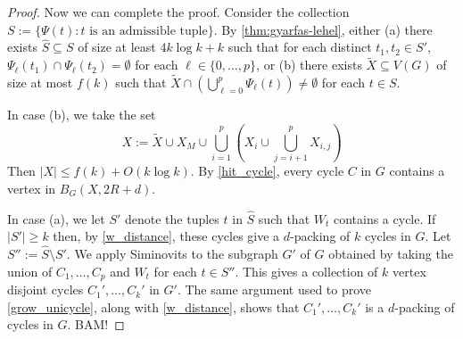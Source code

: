 \documentclass{patmorin}
\begin{document}
\begin{proof}
Now we can complete the proof. Consider the collection $S:=\{\Psi(t):\text{$t$ is an admissible tuple}\}$.  By \cref{thm:gyarfas-lehel}, either (a) there exists $\hat{S}\subseteq S$ of size at least $4k\log k+k$ such that for each distinct  $t_1,t_2\in S'$, $\Psi_\ell(t_1)\cap\Psi_\ell(t_2)=\emptyset$ for each $\ell\in\{0,\ldots,p\}$, or (b) there exists $\tilde{X}\subseteq V(G)$ of size at most $f(k)$ such that $\tilde{X}\cap(\bigcup_{\ell=0}^p \Psi_\ell(t))\neq\emptyset$ for each $t\in S$.

In case (b), we take the set
\[
   X:=\tilde{X}\cup X_M\cup \bigcup_{i=1}^p \left(X_i\cup \bigcup_{j=i+1}^p X_{i,j} \right)
\]
Then $|X|\le f(k) + O(k\log k)$.
By \cref{hit_cycle}, every cycle $C$ in $G$ contains a vertex in $B_G(X,2R+d)$.

In case (a), we let $S'$ denote the tuples $t$ in $\hat{S}$  such that $W_t$ contains a cycle.  If $|S'|\ge k$ then, by \cref{w_distance}, these cycles give a $d$-packing of $k$ cycles in $G$.  Let $S'':=\hat{S}\setminus S'$.  We apply Siminovits to the subgraph $G'$ of $G$ obtained by taking the union of $C_1,\ldots,C_p$ and $W_t$ for each $t\in S''$.  This gives a collection of $k$ vertex disjoint cycles $C_1',\ldots,C_k'$ in $G'$.  The same argument used to prove \cref{grow_unicycle}, along with \cref{w_distance}, shows that $C_1',\ldots,C_k'$ is a $d$-packing of cycles in $G$. BAM!
\end{proof}



\end{document}
